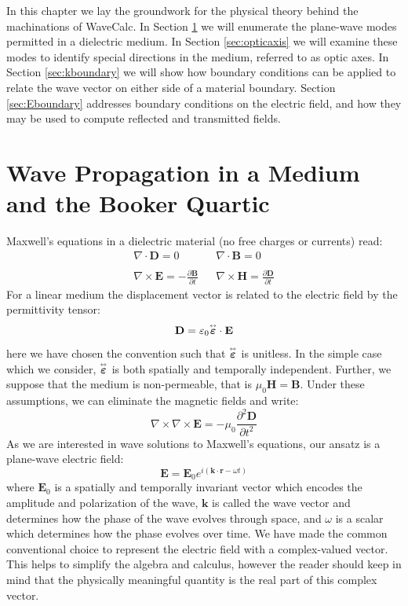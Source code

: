 \documentclass[11pt, reqno]{book}%
\newcounter{ct}
\newcommand{\es}{\begin{equation}}
\newcommand{\ef}{\end{equation} \vspace{0.05in}}
\newcommand{\mbf}{\mathbf}
\newcommand{\mbfg}[1]{\mbf{\mbox{\boldmath$#1$}}}
\newcommand{\ve}{\varepsilon}
\newcommand{\tens}{\overset{\text{\tiny$\leftrightarrow$}}}
\begin{document}
In this chapter we lay the groundwork for the physical theory behind the machinations of WaveCalc. In Section \ref{sec:bookerquart} we will enumerate the plane-wave modes permitted in a dielectric medium. In Section \ref{sec:opticaxis} we will examine these modes to identify special directions in the medium, referred to as optic axes. In Section \ref{sec:kboundary} we will show how boundary conditions can be applied to relate the wave vector on either side of a material boundary. Section \ref{sec:Eboundary} addresses boundary conditions on the electric field, and how they may be used to compute reflected and transmitted fields. 




\section{Wave Propagation in a Medium and the Booker Quartic}
\label{sec:bookerquart}

Maxwell's equations in a dielectric material (no free charges or currents) read:
\es
\begin{array}{ccc}
\nabla\cdot \mbf{D}= 0 & & \nabla\cdot \mbf{B}=0 \\
& & \\
\nabla \times \mbf{E} = -\frac{\partial \mbf{B}}{\partial t} & & \nabla\times \mbf{H} = \frac{\partial \mbf{D}}{\partial t}
\end{array}
\ef
\noindent For a linear medium the displacement vector is related to the electric field by the permittivity tensor:
\es
 \mbf{D} = \ve_0 \tens{\mbfg{\ve}}\cdot \mbf{E}
 \label{eq:displacevec}
 \ef
 \noindent here we have chosen the convention such that $\tens{\mbfg{\ve}}$ is unitless. In the simple case which we consider, $\tens{\mbfg{\ve}}$ is both spatially and temporally independent. Further, we suppose that the medium is non-permeable, that is $\mu_0 \mbf{H} = \mbf{B}$. Under these assumptions, we can eliminate the magnetic fields and write:
 \es
 \nabla\times\nabla\times \mbf{E} = -\mu_0 \frac{\partial^2 \mbf{D}}{\partial t^2}
 \label{eq:doublecrossE}
 \ef
 \noindent As we are interested in wave solutions to Maxwell's equations, our ansatz is a plane-wave electric field:
\es
\mbf{E} = \mbf{E}_0 e^{i(\mbf{k}\cdot \mbf{r}-\omega t)}
\label{eq:ansatz}
\ef
\noindent where $\mbf{E}_0$ is a spatially and temporally invariant vector which encodes the amplitude and polarization of the wave, $\mbf{k}$ is called the wave vector and determines how the phase of the wave evolves through space, and $\omega$ is a scalar which determines how the phase evolves over time. We have made the common conventional choice to represent the electric field with a complex-valued vector. This helps to simplify the algebra and calculus, however the reader should keep in mind that the physically meaningful quantity is the real part of this complex vector.
\end{document}
